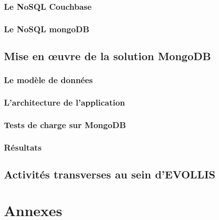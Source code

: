                 \section{Le \textsf{NoSQL Couchbase}}\label{couchbase}
                

                \section{Le \textsf{NoSQL mongoDB}}\label{mongodb}
                

     \chapter{Mise en œuvre de la solution \textsf{MongoDB}}

                \section{Le modèle de données}

                \section{L'architecture de l'application}

                \section{Tests de charge sur \textsf{MongoDB}}
     
                \section{Résultats}

      \chapter{Activités transverses au sein d'\textsf{EVOLLIS}}

      

\printindex

\nocite{cassandra2}
\nocite{cassandra}
\nocite{NoSQLCmp}
\nocite{NoSQLeurope}
\nocite{NoSQLvsSQL}



\part{Annexes}
\appendix




